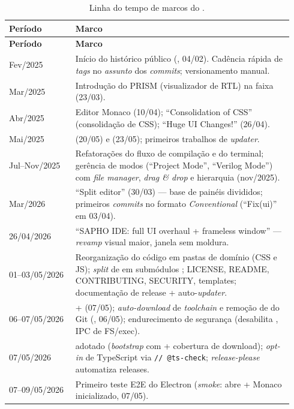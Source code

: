 \begin{longtable}{P{0.22\linewidth} Q{0.72\linewidth}}
  \caption{Linha do tempo de marcos do .}
  \label{tab:18-timeline}\\
  \toprule
  \textbf{Período} & \textbf{Marco} \\
  \midrule
  \endfirsthead
  \toprule
  \textbf{Período} & \textbf{Marco} \\
  \midrule
  \endhead
  \bottomrule
  \endfoot
  Fev/2025 & Início do histórico público (, 04/02). Cadência rápida de \emph{tags}  no \emph{assunto} dos \emph{commits}; versionamento manual. \\
  Mar/2025 & Introdução do PRISM (visualizador de RTL) na faixa  (23/03). \\
  Abr/2025 & Editor Monaco (10/04); \enquote{Consolidation of CSS} (consolidação de CSS);  \enquote{Huge UI Changes!} (26/04). \\
  Mai/2025 &  (20/05) e  (23/05); primeiros trabalhos de \emph{updater}. \\
  Jul--Nov/2025 & Refatorações do fluxo de compilação e do terminal; gerência de modos (\enquote{Project Mode}, \enquote{Verilog Mode}) com \emph{file manager}, \emph{drag \& drop} e hierarquia (nov/2025). \\
  Mar/2026 & \enquote{Split editor} (30/03) --- base de painéis divididos; primeiros \emph{commits} no formato \emph{Conventional} (\enquote{Fix(ui)} em 03/04). \\
  26/04/2026 & \enquote{SAPHO IDE: full UI overhaul + frameless window} --- \emph{revamp} visual maior, janela sem moldura. \\
  01--03/05/2026 & Reorganização do código em pastas de domínio (CSS e JS); \emph{split} de  em submódulos ; LICENSE, README, CONTRIBUTING, SECURITY, templates; documentação de release + auto-\emph{updater}. \\
  06--07/05/2026 &  +  (07/05); \emph{auto-download} de \emph{toolchain} e remoção de  do Git (, 06/05); endurecimento de segurança (desabilita , IPC de FS/exec). \\
  07/05/2026 &  adotado (\emph{bootstrap} com  + cobertura de download); \emph{opt-in} de TypeScript via \lstinline|// @ts-check|; \emph{release-please} automatiza releases. \\
  07--09/05/2026 & Primeiro teste E2E do Electron (\emph{smoke}: abre + Monaco inicializado, 07/05). \\

\end{longtable}
